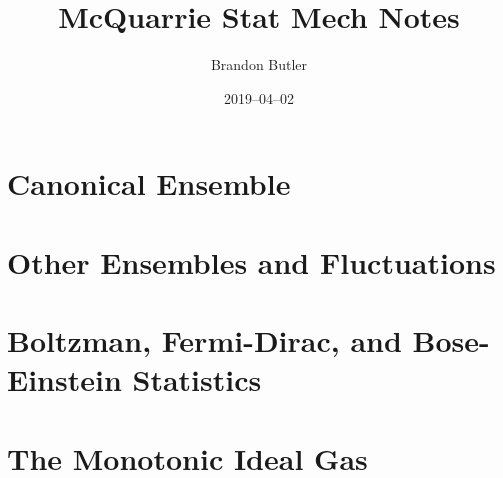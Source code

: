 \documentclass{report}
\title{McQuarrie Stat Mech Notes}
\author{Brandon Butler}
\date{2019--04--02}
\begin{document}
\chapter{Canonical Ensemble}

\chapter{Other Ensembles and Fluctuations}

\chapter{Boltzman, Fermi-Dirac, and Bose-Einstein Statistics}

\chapter{The Monotonic Ideal Gas}

\end{document}
